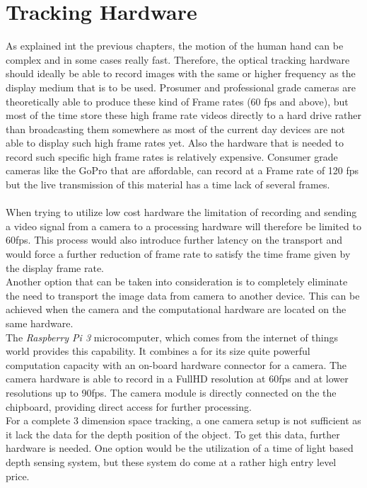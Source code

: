 \section{Tracking Hardware}
 As explained int the previous chapters, the motion of the human hand can be complex and in some cases really fast. Therefore, the optical tracking hardware should ideally be able to record images with the same or higher frequency as the display medium that is to be used. Prosumer and professional grade cameras are theoretically able to produce these kind of Frame rates (60 fps and above), but most of the time store these high frame rate videos directly to a hard drive rather than broadcasting them somewhere as most of the current day devices are not able to display such high frame rates yet. Also the hardware that is needed to record such specific high frame rates is relatively expensive. Consumer grade cameras like the GoPro that are affordable, can record at a Frame rate of 120 fps but the live transmission of this material has a time lack of several frames.\\
\\When trying to utilize low cost hardware the limitation of recording and sending a video signal from a camera to a processing hardware will therefore be limited to 60fps. This process would also introduce further latency on the transport and would force a further reduction of frame rate to satisfy the time frame given by the display frame rate.
\\Another option that can be taken into consideration is to completely eliminate the need to transport the image data from camera to another device. This can be achieved when the camera and the computational hardware are located on the same hardware.\\The \textit{Raspberry Pi 3} microcomputer, which comes from the internet of things world provides this capability. It combines a for its size quite powerful computation capacity with an on-board hardware connector for a camera. The camera hardware is able to record in a FullHD resolution at 60fps and at lower resolutions up to 90fps. The camera module is directly connected on the the chipboard, providing direct access for further processing.\\
For a complete 3 dimension space tracking, a one camera setup is not sufficient as it lack the data for the depth position of the object. To get this data, further hardware is needed. One option would be the utilization of a time of light based depth sensing system, but these system do come at a rather high entry level price.

